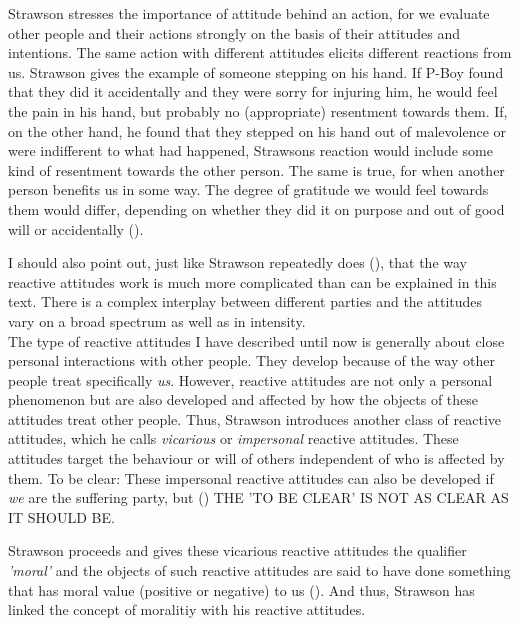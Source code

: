 \documentclass{article}
\newcounter{example}[section]
\begin{document}
Strawson stresses the importance of attitude behind an action, for we evaluate
other people and their actions strongly on the basis of their attitudes and
intentions. The same action with different attitudes elicits different reactions
from us. Strawson gives the example of someone stepping on his hand. If P-Boy
found that they did it accidentally and they were sorry for injuring him, he
would feel the pain in his hand, but probably no (appropriate) resentment
towards them. If, on the other hand, he found that they stepped on his hand out
of malevolence or were indifferent to what had happened, Strawsons reaction
would include some kind of resentment towards the other person. The same is
true, for when another person benefits us in some way. The degree of gratitude
we would feel towards them would differ, depending on whether they did it on
purpose and out of good will or accidentally (\cite[p.6]{Strawson1962}).

I should also point out, just like Strawson repeatedly does (\cite[p.5,
p.7]{Strawson1962}), that the way reactive attitudes work is much more
complicated than can be explained in this text. There is a complex
interplay between different parties and the attitudes vary on a broad spectrum
as well as in intensity.\\

The type of reactive attitudes I have described until now is generally about close
personal interactions with other people. They develop because of the way other
people treat specifically \textit{us}. 
However, reactive attitudes are not only a personal phenomenon but are also developed
and affected by how the objects of these attitudes treat other people.
Thus, Strawson introduces another class of reactive attitudes, which he calls
\textit{vicarious} or \textit{impersonal} reactive attitudes. These attitudes
target the behaviour or will of others independent of who is affected by them.
To be clear: These impersonal reactive attitudes can also be
developed if \textit{we} are the suffering party, but (\cite[p.15]{Strawson1962})
THE 'TO BE CLEAR' IS NOT AS CLEAR AS IT SHOULD BE.

Strawson proceeds and gives these vicarious reactive attitudes the
qualifier \textit{'moral'} and the objects of such reactive attitudes are said
to have done something that has moral value (positive or negative) to us
(\cite[p.15]{Strawson1962}). And thus, Strawson has linked the concept of
moralitiy with his reactive attitudes.
\end{document}
